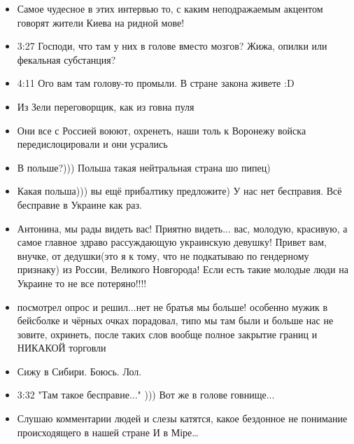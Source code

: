 \begin{itemize}
\item Самое чудесное в этих интервью то, с каким неподражаемым акцентом говорят жители Киева на ридной мове!
\item 3:27 Господи, что там у них в голове вместо мозгов? Жижа, опилки или фекальная субстанция?
\item 4:11 Ого вам там голову-то промыли. В стране закона живете :D
\item Из Зели переговорщик, как из говна пуля
\item Они все с Россией воюют, охренеть, наши толь к Воронежу войска передислоцировали и они усрались
\item В польше?))) Польша такая нейтральная страна шо пипец)
\item Какая польша))) вы ещё прибалтику предложите) У нас нет бесправия. Всё бесправие в Украине как раз.
\item Антонина, мы рады видеть вас!
Приятно видеть... вас, молодую, красивую, а самое главное здраво рассуждающую украинскую девушку!
Привет вам, внучке, от дедушки(это я к тому, что не подкатываю по гендерному признаку) из России, Великого Новгорода!
Если есть такие молодые люди на Украине то не все потеряно!!!!
\item посмотрел опрос и решил...нет не братья мы больше!  особенно мужик в бейсболке и чёрных очках порадовал,  типо мы там были и больше нас не зовите, охринеть, после таких слов вообще полное закрытие границ и НИКАКОЙ торговли
\item Сижу в Сибири. Боюсь. Лол.
\item 3:32 "Там такое бесправие..." ))) Вот же в голове говнище...
\item Слушаю комментарии людей и слезы катятся, какое бездонное не понимание происходящего в нашей стране И в Міре…
\end{itemize}




